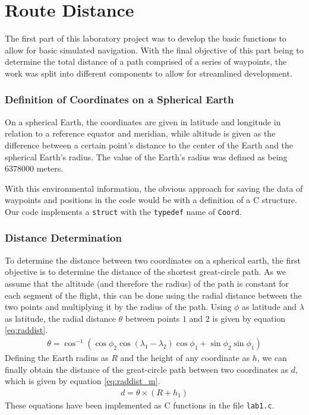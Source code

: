 \documentclass{article}
\begin{document}
\part{Route Distance}

The first part of this laboratory project was to develop the basic functions to allow for basic simulated navigation. With the final objective of this part being to determine the total distance of a path comprised of a series of waypoints, the work was split into different components to allow for streamlined development.

\section{Definition of Coordinates on a Spherical Earth}

On a spherical Earth, the coordinates are given in latitude and longitude in relation to a reference equator and meridian, while altitude is given as the difference between a certain point's distance to the center of the Earth and the spherical Earth's radius. The value of the Earth's radius was defined as being $6378000$ meters.

With this environmental information, the obvious approach for saving the data of waypoints and positions in the code would be with a definition of a C structure. Our code implements a \texttt{struct} with the \texttt{typedef} name of \texttt{Coord}.

\section{Distance Determination} \label{sec:dist_det}

To determine the distance between two coordinates on a spherical earth, the first objective is to determine the distance of the shortest great-circle path. As we assume that the altitude (and therefore the radius) of the path is constant for each segment of the flight, this can be done using the radial distance between the two points and multiplying it by the radius of the path. Using $\phi$ as latitude and $\lambda$ as latitude, the radial distance $\theta$ between points $1$ and $2$ is given by equation \ref{eq:raddist}.
\begin{gather} \label{eq:raddist}
    \theta = \cos^{-1}{\left(\cos\phi_2\cos\left(\lambda_1 - \lambda_2\right)\cos\phi_1 + \sin\phi_2\sin\phi_1\right)}
\end{gather}
Defining the Earth radius as $R$ and the height of any coordinate as $h$, we can finally obtain the distance of the great-circle path between two coordinates as $d$, which is given by equation \ref{eq:raddist_m}.
\begin{gather} \label{eq:raddist_m}
    d = \theta \times (R + h_1)
\end{gather}
These equations have been implemented as C functions in the file \texttt{lab1.c}.
\end{document}
